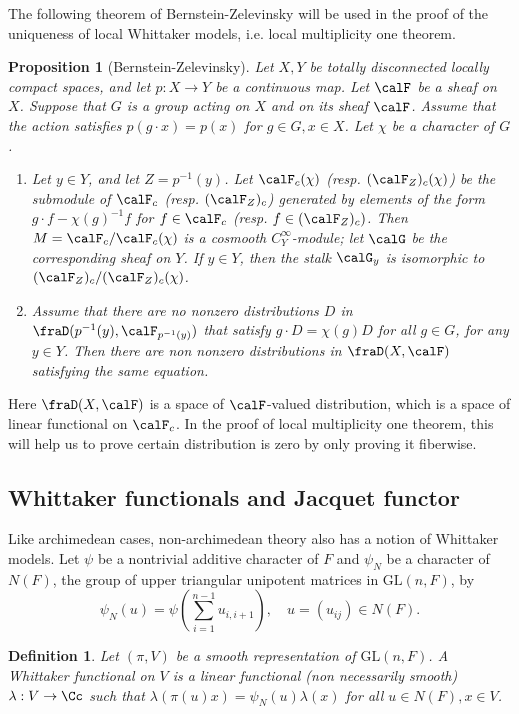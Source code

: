 \documentclass{article}
\newtheorem{definition}{Definition}[section]
\newcommand{\GL}{\mathrm{GL}}
\newtheorem{proposition}{Proposition}[section]
\begin{document}
The following theorem of Bernstein-Zelevinsky will be used in the proof of the uniqueness of local Whittaker models, i.e. local multiplicity one theorem. 
\begin{proposition}[Bernstein-Zelevinsky]
\label{bz}
Let $X, Y$ be totally disconnected locally compact spaces, and let $p:X\to Y$ be a continuous map. 
Let $\calF$ be a sheaf on $X$. 
Suppose that  $G$ is a group acting on $X$ and on its sheaf $\calF$. Assume that the action  satisfies $p(g\cdot x) = p(x)$ for $g\in G, x\in X$. 
Let $\chi$ be a character of $G$. 
\begin{enumerate}
\item Let $y\in Y$, and let $Z = p^{-1}(y)$. 
Let $\calF_{c}(\chi)$ (resp. $(\calF_{Z})_{c}(\chi)$) be the submodule of $\calF_{c}$ (resp. $(\calF_{Z})_{c}$) generated by elements of the form $g\cdot f - \chi(g)^{-1}f$ for $f\in \calF_{c}$ (resp. $f\in (\calF_{Z})_{c})$. 
Then $M =\calF_{c}/ \calF_{c}(\chi)$ is a cosmooth $C_{Y}^{\infty}$-module; let $\calG$ be the corresponding sheaf on $Y$. If $y\in Y$, then the stalk $\calG_{y}$ is isomorphic to $(\calF_{Z})_{c} / (\calF_{Z})_{c}(\chi)$. 
\item Assume that there are no nonzero distributions $D$ in $\fraD(p^{-1}(y), \calF_{p^{-1}(y)})$ that satisfy $g\cdot D = \chi(g)D$ for all $g\in G$, for any $y\in Y$. 
Then there are non nonzero distributions in $\fraD(X, \calF)$ satisfying the same equation. 
\end{enumerate}
\end{proposition}
Here $\fraD(X, \calF)$ is a space of $\calF$-valued distribution, which is a space of linear functional on $\calF_{c}$. In the proof of local multiplicity one theorem, this will help us to prove certain distribution is zero by only proving it fiberwise. 



\subsection{Whittaker functionals and Jacquet functor}
Like archimedean cases, non-archimedean theory also has a notion of Whittaker models. 
Let $\psi$ be a nontrivial additive character of $F$ and $\psi_{N}$ be a character of $N(F)$, the group of upper triangular unipotent matrices in $\GL(n, F)$, by
$$
\psi_{N}(u) = \psi\left( \sum_{i=1}^{n-1} u_{i, i+1}\right), \quad u = (u_{ij})\in N(F). 
$$

\begin{definition}
Let $(\pi, V)$ be a smooth representation of $\GL(n, F)$. 
A Whittaker functional on $V$ is a linear functional (non necessarily smooth) $\lambda: V\to \Cc$ such that $\lambda(\pi(u)x) = \psi_{N}(u)\lambda(x)$ for all $u\in N(F), x\in V$.
\end{definition}
\end{document}
